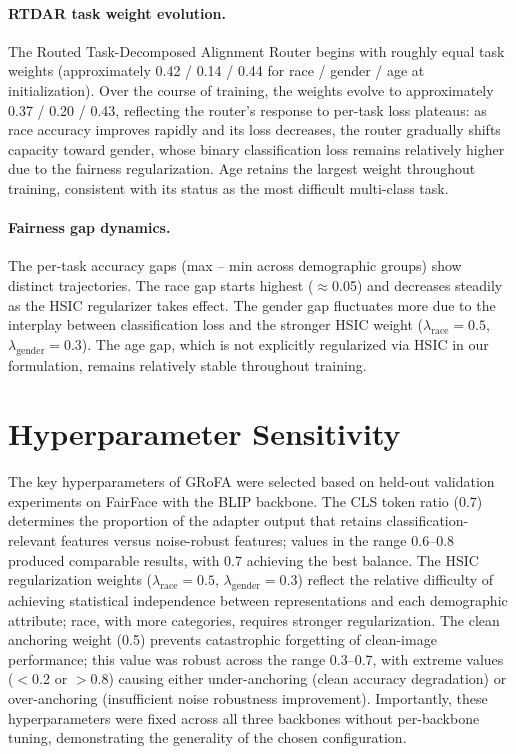 \paragraph{RTDAR task weight evolution.}
The Routed Task-Decomposed Alignment Router begins with roughly equal task weights (approximately 0.42 / 0.14 / 0.44 for race / gender / age at initialization).
Over the course of training, the weights evolve to approximately 0.37 / 0.20 / 0.43, reflecting the router's response to per-task loss plateaus: as race accuracy improves rapidly and its loss decreases, the router gradually shifts capacity toward gender, whose binary classification loss remains relatively higher due to the fairness regularization.
Age retains the largest weight throughout training, consistent with its status as the most difficult multi-class task.

\paragraph{Fairness gap dynamics.}
The per-task accuracy gaps (max -- min across demographic groups) show distinct trajectories.
The race gap starts highest ($\approx$0.05) and decreases steadily as the HSIC regularizer takes effect.
The gender gap fluctuates more due to the interplay between classification loss and the stronger HSIC weight ($\lambda_{\text{race}} = 0.5$, $\lambda_{\text{gender}} = 0.3$).
The age gap, which is not explicitly regularized via HSIC in our formulation, remains relatively stable throughout training.



\section{Hyperparameter Sensitivity}
\label{app:hpsens}

The key hyperparameters of GRoFA were selected based on held-out validation experiments on FairFace with the BLIP backbone.
The CLS token ratio (0.7) determines the proportion of the adapter output that retains classification-relevant features versus noise-robust features; values in the range 0.6--0.8 produced comparable results, with 0.7 achieving the best balance.
The HSIC regularization weights ($\lambda_{\text{race}} = 0.5$, $\lambda_{\text{gender}} = 0.3$) reflect the relative difficulty of achieving statistical independence between representations and each demographic attribute; race, with more categories, requires stronger regularization.
The clean anchoring weight (0.5) prevents catastrophic forgetting of clean-image performance; this value was robust across the range 0.3--0.7, with extreme values ($<$0.2 or $>$0.8) causing either under-anchoring (clean accuracy degradation) or over-anchoring (insufficient noise robustness improvement).
Importantly, these hyperparameters were fixed across all three backbones without per-backbone tuning, demonstrating the generality of the chosen configuration.


